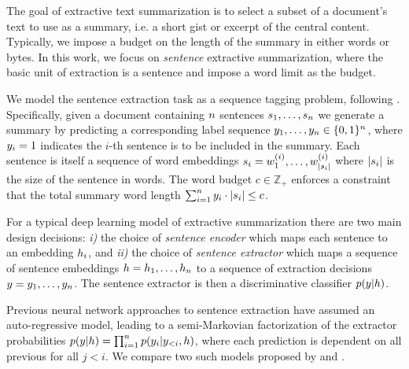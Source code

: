 The goal of extractive text summarization is to select a subset of a 
document's text to use as a summary, i.e. a short gist or excerpt of the 
central content.
Typically, we impose a budget on the length of the summary in either 
words or bytes. In this work, we focus on \textit{sentence} extractive 
summarization, 
where the basic unit of extraction is a sentence and impose a word limit as 
the budget.

We model the sentence extraction task as a sequence tagging problem, 
following \cite{}.
Specifically, given a document containing $n$ sentences 
$\sent_1, \ldots, \sent_{\docSize}$ we generate a summary by predicting a 
corresponding label sequence $\slabel_1, \ldots, \slabel_{\docSize} 
\in \{0, 1\}^{\docSize}$, where $\slabel_i = 1$ 
indicates the $i$-th sentence is to be included in the summary.
Each sentence is itself a sequence of word embeddings 
$\sent[i] = \wordEmb[1]^{(i)}, \ldots, \wordEmb[{|\sent[i]|}]^{(i)}$ where
$|\sent[i]|$ is the size of the sentence in words.
The word budget $c \in \mathbb{Z}_+$ 
enforces a constraint that the total summary word length 
$\sum_{i=1}^\docSize \slabel_i \cdot |\sent[i]| \le c$.



For a typical deep learning model of extractive 
summarization there are two main design decisions:
\textit{i)}  the choice of \textit{sentence encoder} 
which maps each sentence \sent[i] 
to an embedding $\sentEmb[i]$, 
and 
\textit{ii)} the choice of \textit{sentence extractor} 
which maps a sequence of sentence embeddings 
$\sentEmb = \sentEmb[1],\ldots, \sentEmb[\docSize]$  
to a sequence of extraction
decisions $\slabel = \slabel_1,\ldots,\slabel_{\docSize}$.
The sentence extractor is then a discriminative 
classifier $p(\slabel | \sentEmb)$.

Previous neural network approaches to sentence extraction have assumed 
an auto-regressive model, leading to a semi-Markovian
factorization of the extractor probabilities 
$p(\slabel|\sentEmb)=\prod_{i=1}^\docSize p(\slabel[i]|\slabel[<i],\sentEmb)$,
where each prediction \slabel[i] is dependent on all previous \slabel[j] for
all $j < i$. We compare two such models proposed by \citet{cheng2016neural}
and \citet{nallapati2017summarunner}.
